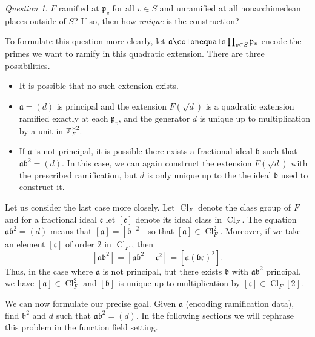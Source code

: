 \documentclass{dcthesis}
\newcommand{\ZZ}{\mathbb Z}
\DeclareMathOperator{\Cl}{Cl}
\numberwithin{equation}{section}
\theoremstyle{definition}
\theoremstyle{remark}
\newtheorem{question}[equation]{Question}
\begin{document}
{{{\begin{question}
      $F$ ramified at $\mathfrak{p}_v$
      for all $v\in S$
      and unramified at all
      nonarchimedean places outside of $S$?
      If so, then
      how \emph{unique} is the construction?
    \end{question}
    To formulate this question more clearly,
    let
    $
      \mathfrak{a}\colonequals
      \prod_{v\in S}\mathfrak{p}_v
    $
    encode the primes
    we want to ramify in this quadratic extension.
    There are three possibilities.
    \begin{itemize}
      \item
        It is possible that no such
        extension exists.
      \item
        $\mathfrak{a}=(d)$ is principal
        and the extension
        $F(\sqrt{d})$ is a quadratic extension
        ramified exactly at each $\mathfrak{p}_v$,
        and the generator $d$ is unique
        up to multiplication
        by a unit in $\ZZ_F^{\times 2}$.
      \item
        If $\mathfrak{a}$ is not principal,
        it is possible there
        exists a fractional ideal
        $\mathfrak{b}$ such that
        $\mathfrak{a}\mathfrak{b}^2=(d)$.
        In this case,
        we can again construct the extension
        $F(\sqrt{d})$ with the prescribed
        ramification,
        but $d$ is only unique up to
        the the ideal $\mathfrak{b}$ used
        to construct it.
    \end{itemize}
    Let us consider the last case more closely.
    Let $\Cl_F$ denote the class group of $F$
    and for a fractional ideal
    $\mathfrak{c}$ let $[\mathfrak{c}]$
    denote its ideal class in $\Cl_F$.
    The equation $\mathfrak{a}\mathfrak{b}^2=(d)$
    means that $[\mathfrak{a}] = [\mathfrak{b}^{-2}]$
    so that $[\mathfrak{a}]\in\Cl_F^2$.
    Moreover, if we take an element
    $[\mathfrak{c}]$
    of order $2$
    in $\Cl_F$,
    then
    \begin{equation}
      \label{eqn:twotorsionintheclassgroup}
      [\mathfrak{a}\mathfrak{b}^2]
      =[\mathfrak{a}\mathfrak{b}^2][\mathfrak{c}^2]
      =[\mathfrak{a}(\mathfrak{bc})^2].
    \end{equation}
    Thus,
    in the case where $\mathfrak{a}$ is not
    principal,
    but there exists $\mathfrak{b}$ with
    $\mathfrak{a}\mathfrak{b}^2$ principal,
    we have
    $[\mathfrak{a}]\in\Cl_F^2$ and
    $[\mathfrak{b}]$ is unique up to
    multiplication by $[\mathfrak{c}]\in\Cl_F[2]$.
    \par
    We can now formulate our precise goal.
    Given $\mathfrak{a}$
    (encoding ramification data),
    find $\mathfrak{b}^2$ and $d$ such that
    $\mathfrak{a}\mathfrak{b}^2=(d)$.
    In the following sections we will rephrase this
    problem in the function field setting.
  }
}}
\end{document}
